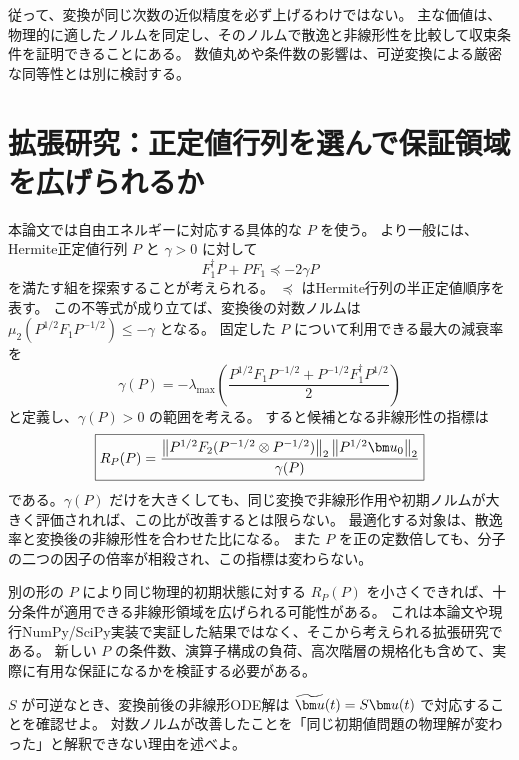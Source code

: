 従って、変換が同じ次数の近似精度を必ず上げるわけではない。
主な価値は、物理的に適したノルムを同定し、そのノルムで散逸と非線形性を比較して収束条件を証明できることにある。
数値丸めや条件数の影響は、可逆変換による厳密な同等性とは別に検討する。

\section{拡張研究：正定値行列を選んで保証領域を広げられるか}
本論文では自由エネルギーに対応する具体的な $P$ を使う。
より一般には、Hermite正定値行列 $P$ と $\gamma>0$ に対して
\[
F_1^\dagger P+PF_1\preceq-2\gamma P
\]
を満たす組を探索することが考えられる。
$\preceq$ はHermite行列の半正定値順序を表す。
この不等式が成り立てば、変換後の対数ノルムは $\mu_2(P^{1/2}F_1P^{-1/2})\leq-\gamma$ となる。
固定した $P$ について利用できる最大の減衰率を
\[
\gamma(P)=-\lambda_{\max}\left(
\frac{P^{1/2}F_1P^{-1/2}+P^{-1/2}F_1^\dagger P^{1/2}}2\right)
\]
と定義し、$\gamma(P)>0$ の範囲を考える。
すると候補となる非線形性の指標は
\[
\boxed{R_P(P)=
\frac{\normtwo{P^{1/2}F_2(P^{-1/2}\otimes P^{-1/2})}
\normtwo{P^{1/2}\uu_0}}{\gamma(P)}}
\]
である。$\gamma(P)$ だけを大きくしても、同じ変換で非線形作用や初期ノルムが大きく評価されれば、この比が改善するとは限らない。
最適化する対象は、散逸率と変換後の非線形性を合わせた比になる。
また $P$ を正の定数倍しても、分子の二つの因子の倍率が相殺され、この指標は変わらない。

別の形の $P$ により同じ物理的初期状態に対する $R_P(P)$ を小さくできれば、十分条件が適用できる非線形領域を広げられる可能性がある。
これは本論文や現行NumPy/SciPy実装で実証した結果ではなく、そこから考えられる拡張研究である。
新しい $P$ の条件数、演算子構成の負荷、高次階層の規格化も含めて、実際に有用な保証になるかを検証する必要がある。


\begin{exercise}[変換の意味]
$S$ が可逆なとき、変換前後の非線形ODE解は $\tu(t)=S\uu(t)$ で対応することを確認せよ。
対数ノルムが改善したことを「同じ初期値問題の物理解が変わった」と解釈できない理由を述べよ。
\end{exercise}

